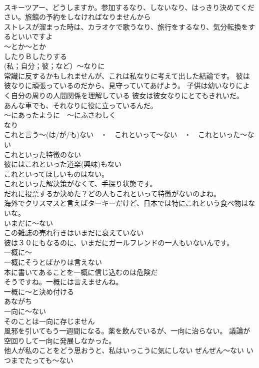 \documentclass[8pt]{extreport}
\begin{document}
\begin{CJK}{UTF8}{min}
\\	スキーツアー、どうしますか。参加するなり、しないなり、はっきり決めてください。旅館の予約をしなければなりませんから 
\\	ストレスが溜まった時は、カラオケで歌うなり、旅行をするなり、気分転換をするといいですよ 
\\	～とか～とか 
\\	したりＢしたりする 
\\	(私；自分；彼；など）～なりに	
\\	常識に反するかもしれませんが、これは私なりに考えて出した結論です。 彼は彼なりに頑張っているのだから、見守っていてあげよう。 子供は幼いなりによく自分の周りの人間関係を理解している 彼女は彼女なりにとてもきれいだ。
\\	あんな車でも、それなりに役に立っているんだ。
\\	～にあったように　～にふさわしく 
\\	なり 
\\	これと言う～(は/が/も)ない　・　これといって～ない　・　これといった～ない	
\\	これといった特徴のない 
\\	彼にはこれといった道楽(興味)もない 
\\	これといってほしいものはない。 
\\	これといった解決策がなくて、手探り状態です。
\\	だれに投票するか決めた？どの人もこれといって特徴がないのよね。
\\	海外でクリスマスと言えばターキーだけど、日本では特にこれという食べ物はないな。
\\	いまだに～ない	
\\	この雑誌の売れ行きはいまだに衰えていない 
\\	彼は３０にもなるのに、いまだにガールフレンドの一人もいないんです。
\\	一概に～
\\	一概にそうとばかりは言えない 
\\	本に書いてあることを一概に信じ込むのは危険だ 
\\	そうですね。一概には言えませんね。 
\\	一概に～と決め付ける 
\\	あながち
\\	一向に～ない	
\\	そのことは一向に存じません 
\\	風邪を引いてもう一週間になる。薬を飲んでいるが、一向に治らない。 議論が空回りして一向に発展しなかった。
\\	他人が私のことをどう思おうと、私はいっこうに気にしない	ぜんぜん～ない いつまでたっても～ない	

\end{CJK}
\end{document}
